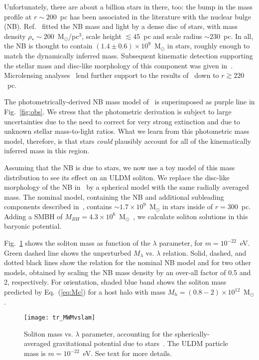\documentclass[aps,prd,floats,superscriptaddress,showpacs,nofootinbib,twocolumn,preprintnumbers]{revtex4-1}%
\begin{document}
Unfortunately, there are about a billion stars in there, too: the bump
in the mass profile at $r\sim200$~pc has been associated in the
literature with the nuclear bulge (NB). 
% 
Ref.~\cite{Launhardt:2002tx}
fitted the NB mass and light by a dense disc of stars, with mass
density $\rho_*\sim200$~M$_\odot$/pc$^3$, scale height $\lesssim45$~pc
and
scale radius $\sim230$~pc. In all, the NB is thought to contain
$(1.4\pm0.6)\times10^9$~M$_\odot$ in stars, roughly enough to match
the dynamically inferred mass. Subsequent kinematic detection
supporting the stellar mass and disc-like morphology of this component
was given in~\cite{2041-8205-812-2-L21}. Microlensing
analyses~\cite{2017ApJ...843L...5W} lend further support to the
results of~\cite{Portail:2016vei,2041-8205-812-2-L21,Launhardt:2002tx}
down to $r\gtrsim220$~pc. 

The photometrically-derived NB mass model of~\cite{Launhardt:2002tx}
is superimposed as purple line in Fig.~\ref{fig:obs}.  We stress that
the photometric derivation is subject to large uncertainties due to
the need to correct for very strong extinction and due to unknown
stellar mass-to-light ratios. What we learn from this photometric mass
model, therefore, is that stars {\it could} plausibly account for all
of the kinematically inferred mass in this region.   

Assuming that the NB is due to stars, we now use a toy model of this
mass distribution to see its effect on an ULDM soliton. We replace
the disc-like morphology of the NB in~\cite{Launhardt:2002tx} by a
spherical model with the same radially averaged mass. The nominal
model, containing the NB and additional subleading components
described in~\cite{Launhardt:2002tx}, contains
$\sim1.7\times10^9$~M$_\odot$ in stars inside of $r=300$~pc. Adding a
SMBH of $M_{BH}=4.3\times10^6$~M$_\odot$~\cite{Ghez2003}, we calculate
soliton solutions in this baryonic potential.  

Fig.~\ref{fig:MWMvslam} shows the soliton mass as function of the
$\lambda$ parameter, for $m=10^{-22}$~eV. Green dashed line shows the
unperturbed $M_\lambda$ vs. $\lambda$ relation. Solid, dashed, and dotted
black lines show the relation for the nominal NB model and for two
other models, obtained by scaling the NB mass density by an over-all
factor of 0.5 and 2, respectively. For orientation, shaded blue band
shows the soliton mass predicted by Eq.~(\ref{eq:Mc}) for a host halo
with mass $M_h=(0.8-2)\times10^{12}$~M$_\odot$. 
%
\begin{figure}[hbp]
\centering
\texttt{[image: tr\_MWMvslam]}
\caption{
Soliton mass vs. $\lambda$ parameter, accounting for the
spherically-averaged gravitational potential due to
stars~\cite{Launhardt:2002tx}. The ULDM particle mass is
$m=10^{-22}$~eV. See text for more details. 
}\label{fig:MWMvslam}
\end{figure}
%
\end{document}
